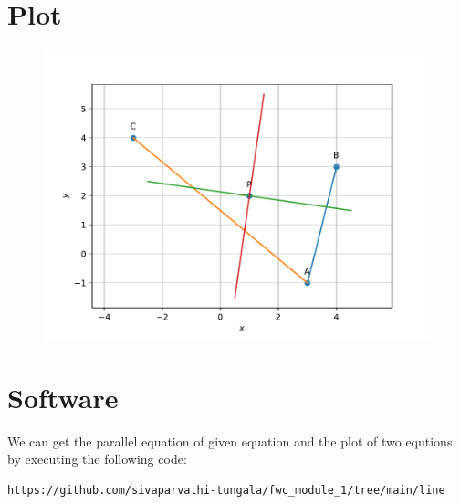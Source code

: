 \section{Plot}
\begin{figure}
       \centering
\includegraphics[width=\columnwidth]{fig.pdf}
       \label{fig:my_label}
\end{figure}
        
\section{Software}
  We can get the parallel equation of given equation and the plot of two equtions by executing the following code:
 \vspace{1mm} 
\begin{lstlisting}
https://github.com/sivaparvathi-tungala/fwc_module_1/tree/main/line
\end{lstlisting}

